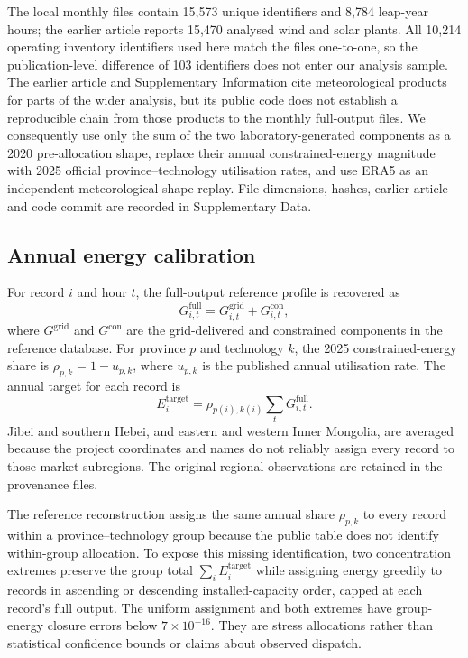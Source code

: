 \documentclass[pdflatex,sn-nature]{sn-jnl}
\begin{document}
The local monthly files contain 15,573 unique identifiers and 8,784 leap-year hours; the earlier article reports 15,470 analysed wind and solar plants. All 10,214 operating inventory identifiers used here match the files one-to-one, so the publication-level difference of 103 identifiers does not enter our analysis sample. The earlier article and Supplementary Information cite meteorological products for parts of the wider analysis, but its public code does not establish a reproducible chain from those products to the monthly full-output files. We consequently use only the sum of the two laboratory-generated components as a 2020 pre-allocation shape, replace their annual constrained-energy magnitude with 2025 official province--technology utilisation rates, and use ERA5 as an independent meteorological-shape replay. File dimensions, hashes, earlier article and code commit are recorded in Supplementary Data.

\subsection{Annual energy calibration}

For record $i$ and hour $t$, the full-output reference profile is recovered as
\begin{equation}
G^{\mathrm{full}}_{i,t}=G^{\mathrm{grid}}_{i,t}+G^{\mathrm{con}}_{i,t},
\label{eq:fulloutput}
\end{equation}
where $G^{\mathrm{grid}}$ and $G^{\mathrm{con}}$ are the grid-delivered and constrained components in the reference database. For province $p$ and technology $k$, the 2025 constrained-energy share is $\rho_{p,k}=1-u_{p,k}$, where $u_{p,k}$ is the published annual utilisation rate. The annual target for each record is
\begin{equation}
E^{\mathrm{target}}_i=\rho_{p(i),k(i)}\sum_t G^{\mathrm{full}}_{i,t}.
\label{eq:annualtarget}
\end{equation}
Jibei and southern Hebei, and eastern and western Inner Mongolia, are averaged because the project coordinates and names do not reliably assign every record to those market subregions. The original regional observations are retained in the provenance files.

The reference reconstruction assigns the same annual share $\rho_{p,k}$ to every record within a province--technology group because the public table does not identify within-group allocation. To expose this missing identification, two concentration extremes preserve the group total $\sum_i E_i^{\mathrm{target}}$ while assigning energy greedily to records in ascending or descending installed-capacity order, capped at each record's full output. The uniform assignment and both extremes have group-energy closure errors below $7\times10^{-16}$. They are stress allocations rather than statistical confidence bounds or claims about observed dispatch.
\end{document}
